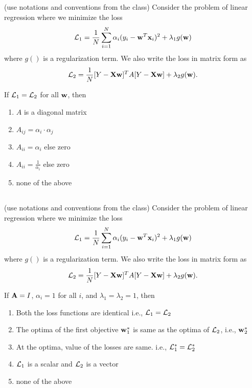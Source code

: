 \begin{frame}
\section{}
  (use notations  and conventions from the class) Consider the problem of linear regression where we minimize the loss
  \[{\cal L}_1 = \frac{1}{N}\sum_{i=1}^N \alpha_i (y_i - {\bf w}^T{\bf x}_i)^2 + \lambda_1 g({\bf w})\] where $g()$ is a regularization term. We also write the loss in matrix form as
  \[ {\cal L}_2 = \frac{1}{N} [Y-{\bf X}{\bf w}]^TA[Y-{\bf X}{\bf w}] + \lambda_2 g({\bf w}). \]


  If ${\cal L}_1 = {\cal L}_2$ for all $\bf{w}$, then
    \begin{enumerate}[label=(\Alph*)]
      \item $A$ is a diagonal matrix %
      \item $A_{ij} = \alpha_i \cdot \alpha_j $
      \item $A_{ii} = \alpha_i$ else zero %
      \item $A_{ii} = \frac{1}{\alpha_i}$ else zero
      \item none of the above   %
    \end{enumerate}
\end{frame}

\begin{frame}
\section{}
  (use notations  and conventions from the class) Consider the problem of linear regression where we minimize the loss
  \[{\cal L}_1 = \frac{1}{N}\sum_{i=1}^N \alpha_i (y_i - {\bf w}^T{\bf x}_i)^2 + \lambda_1 g({\bf w})\] where $g()$ is a regularization term. We also write the loss in matrix form as
  \[ {\cal L}_2 = \frac{1}{N} [Y-{\bf X}{\bf w}]^TA[Y-{\bf X}{\bf w}] + \lambda_2 g({\bf w}). \]


  If ${\bf A} = I$, $\alpha_i = 1$ for all $i$, and $\lambda_1 = \lambda_2 = 1$, then
   \begin{enumerate}[label=(\Alph*)]
     \item Both the loss functions are identical i.e., ${\cal L}_1 = {\cal L}_2$ %
    \item The optima of the first objective ${\bf w}_1^*$ is same as the optima of ${\cal L}_2$, i.e., ${\bf w}_2^*$ %
    \item At the optima,  value of the losses are same. i.e., ${\cal L}_1^* = {\cal L}_2^*$ %
    \item ${\cal L}_1$ is a scalar and ${\cal L}_2$ is a vector
    \item none of the above   %
     \end{enumerate}
\end{frame}

